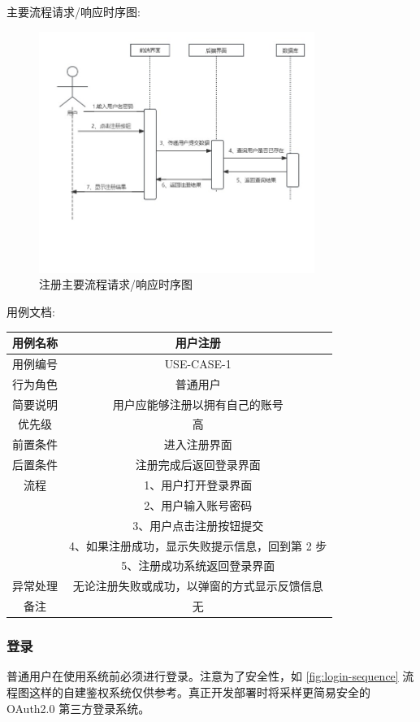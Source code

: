 \documentclass[12pt]{ctexart} %
\begin{document}
主要流程请求/响应时序图:

\begin{figure}[htbp]
  \centering
  \includegraphics[width=0.8\textwidth]{yongli1.jpg}
  \caption{注册主要流程请求/响应时序图}
\end{figure}

用例文档:

\begin{tabular}{|c|c|}
  \hline
  用例名称& 用户注册\\
  \hline
  用例编号 & USE-CASE-1\\
  \hline
  行为角色 & 普通用户\\
  \hline
  简要说明 & 用户应能够注册以拥有自己的账号\\
  \hline
  优先级 & 高\\
  \hline
  前置条件 & 进入注册界面\\
  \hline
  后置条件 & 注册完成后返回登录界面\\
  \hline
  流程 & 1、用户打开登录界面\\
      & 2、用户输入账号密码\\
      & 3、用户点击注册按钮提交\\
      & 4、如果注册成功，显示失败提示信息，回到第 2 步\\
      & 5、注册成功系统返回登录界面\\
  \hline
  异常处理 & 无论注册失败或成功，以弹窗的方式显示反馈信息\\
  \hline
  备注 & 无\\
  \hline
\end{tabular}

\subsubsection{登录}
普通用户在使用系统前必须进行登录。注意为了安全性，如 \ref{fig:login-sequence} 流程图这样的自建鉴权系统仅供参考。真正开发部署时将采样更简易安全的 OAuth2.0 第三方登录系统。
\end{document}
